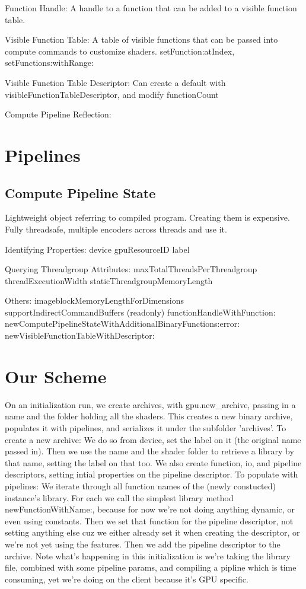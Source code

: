 Function Handle:
A handle to a function that can be added to a visible function table.

Visible Function Table:
A table of visible functions that can be passed into compute commands to customize shaders. 
setFunction:atIndex, setFunctions:withRange:

Visible Function Table Descriptor:
Can create a default with visibleFunctionTableDescriptor, and modify functionCount

Compute Pipeline Reflection:



\section{Pipelines}

\subsection{Compute Pipeline State}
Lightweight object referring to compiled program.
Creating them is expensive.
Fully threadsafe, multiple encoders across threads and use it. 

Identifying Properties:
device
gpuResourceID
label

Querying Threadgroup Attributes:
maxTotalThreadsPerThreadgroup
threadExecutionWidth
staticThreadgroupMemoryLength

Others:
imageblockMemoryLengthForDimensions
supportIndirectCommandBuffers (readonly)
functionHandleWithFunction:
newComputePipelineStateWithAdditionalBinaryFunctions:error:
newVisibleFunctionTableWithDescriptor:


\section{Our Scheme}

On an initialization run, we create archives, with gpu.new_archive, passing in a name and the folder holding all the shaders.
This creates a new binary archive, populates it with pipelines, and serializes it under the subfolder 'archives'.
To create a new archive:
    We do so from device, set the label on it (the original name passed in).
    Then we use the name and the shader folder to retrieve a library by that name, setting the label on that too.
    We also create function, io, and pipeline descriptors, setting intial properties on the pipeline descriptor.
To populate with pipelines:
    We iterate through all function names of the (newly constucted) instance's library.
    For each we call the simplest library method newFunctionWithName:, because for now we're not doing anything dynamic, or even using constants.
    Then we set that function for the pipeline descriptor, not setting anything else cuz we either already set it when creating the descriptor, or we're not yet using the features.
    Then we add the pipeline descriptor to the archive.
Note what's happening in this initialization is we're taking the library file, combined with some pipeline params, and compiling a pipline which is time consuming, yet we're doing on the client because it's GPU specific.

